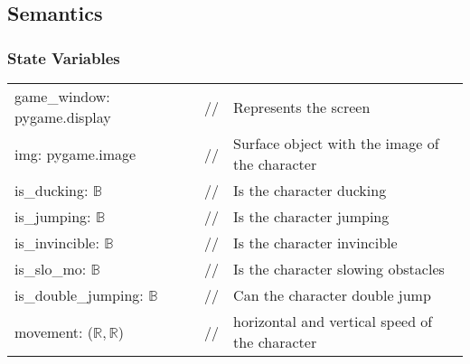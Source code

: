 \documentclass[12pt]{article}
\begin{document}

\subsection* {Semantics}

\subsubsection* {State Variables}

\begin{tabular}{lll}
    game\_window: pygame.display & // & Represents the screen \\
    img: pygame.image & // & Surface object with the image of the character\\
    is\_ducking: $\mathbb{B}$ & // & Is the character ducking\\
    is\_jumping: $\mathbb{B}$ & // & Is the character jumping\\
    is\_invincible: $\mathbb{B}$ & // & Is the character invincible\\
    is\_slo\_mo: $\mathbb{B}$ & // & Is the character slowing obstacles\\
    is\_double\_jumping: $\mathbb{B}$ & // & Can the character double jump\\
    movement: ($\mathbb{R,R}$) & // & horizontal and vertical speed of the character\\
\end{tabular}
\end{document}
